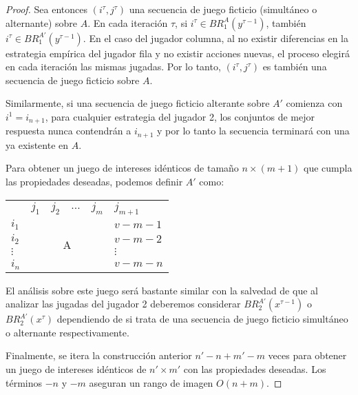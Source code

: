 \begin{proof}
    Sea entonces $(i^\tau, j^\tau)$ una secuencia de juego ficticio (simultáneo o alternante) sobre $A$. En cada iteración $\tau$, si $i^\tau \in BR_1^A(y^{\tau-1})$, también $i^\tau \in BR_1^{A'}(y^{\tau-1})$. En el caso del jugador columna, al no existir diferencias en la estrategia empírica del jugador fila y no existir acciones nuevas, el proceso elegirá en cada iteración las mismas jugadas. Por lo tanto, $(i^\tau, j^\tau)$ es también una secuencia de juego ficticio sobre $A$.

    Similarmente, si una secuencia de juego ficticio alterante sobre $A'$ comienza con $i^1 = i_{n+1}$, para cualquier estrategia del jugador 2, los conjuntos de mejor respuesta nunca contendrán a $i_{n+1}$ y por lo tanto la secuencia terminará con una ya existente en $A$.

    Para obtener un juego de intereses idénticos de tamaño $n \times (m+1)$ que cumpla las propiedades deseadas, podemos definir $A'$ como:

    \begin{center}
        \begin{tabular}{lcllll}
                                    & \multicolumn{1}{l}{$j_1$} & $j_2$ & $\dots$ & $j_m$ & $j_{m+1}$                        \\ \cline{2-6} 
        \multicolumn{1}{l|}{$i_1$}    & \multicolumn{4}{c|}{\multirow{4}{*}{\huge A}}       & \multicolumn{1}{l|}{$v - m - 1$} \\
        \multicolumn{1}{l|}{$i_2$}    & \multicolumn{4}{c|}{}                               & \multicolumn{1}{l|}{$v - m - 2$} \\
        \multicolumn{1}{l|}{$\vdots$} & \multicolumn{4}{c|}{}                               & \multicolumn{1}{l|}{$\vdots$}    \\
        \multicolumn{1}{l|}{$i_n$}    & \multicolumn{4}{c|}{}                               & \multicolumn{1}{l|}{$v - m - n$} \\ \cline{2-6} 
        \end{tabular}
    \end{center}
    
    El análisis sobre este juego será bastante similar con la salvedad de que al analizar las jugadas del jugador 2 deberemos considerar $BR_2^{A'}(x^{\tau-1})$ o $BR_2^{A'}(x^\tau)$ dependiendo de si trata de una secuencia de juego ficticio simultáneo o alternante respectivamente.

    Finalmente, se itera la construcción anterior $n'-n+m'-m$ veces para obtener un juego de intereses idénticos de $n'\times m'$ con las propiedades deseadas.
    Los términos $-n$ y $-m$ aseguran un rango de imagen $O(n+m)$.

\end{proof}


